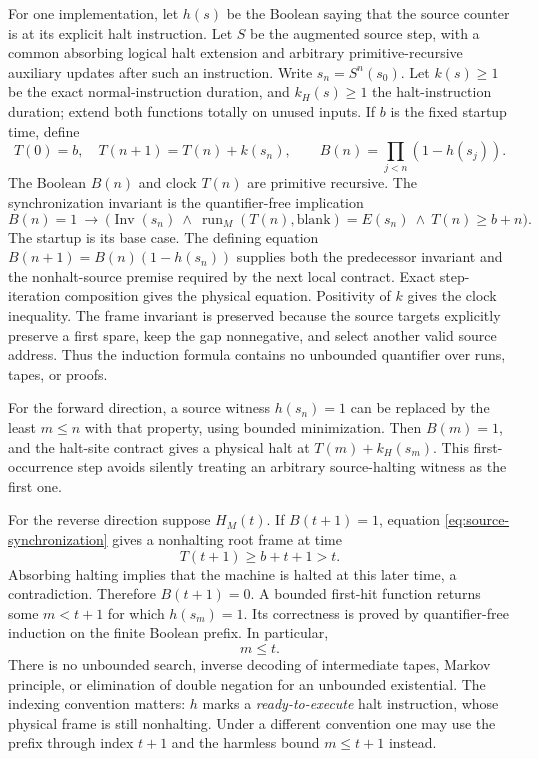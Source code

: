 For one implementation, let $h(s)$ be the Boolean saying that the source
counter is at its explicit halt instruction.  Let $S$ be the augmented
source step, with a common absorbing logical halt extension and arbitrary
primitive-recursive auxiliary updates after such an instruction.  Write $s_n=S^n(s_0)$.  Let $k(s)\ge1$ be the exact
normal-instruction duration, and $k_H(s)\ge1$ the halt-instruction duration;
extend both functions totally on unused inputs.  If $b$ is the fixed
startup time, define
\[
 T(0)=b,\quad T(n+1)=T(n)+k(s_n),\qquad
 B(n)=\prod_{j<n}(1-h(s_j)).
\]
The Boolean $B(n)$ and clock $T(n)$ are primitive recursive.
The synchronization invariant is the quantifier-free implication
\[
 B(n)=1\ \longrightarrow\
 \bigl(\operatorname{Inv}(s_n)\ \wedge\
   \operatorname{run}_M(T(n),\mathrm{blank})=E(s_n)
   \ \wedge\ T(n)\ge b+n\bigr).
 \tag{S}\label{eq:source-synchronization}
\]
The startup is its base case.  The defining equation
$B(n+1)=B(n)(1-h(s_n))$ supplies both the predecessor invariant and the
nonhalt-source premise required by the next local contract.  Exact
step-iteration composition gives the physical equation.  Positivity of
$k$ gives the clock inequality.  The frame invariant is preserved because
the source targets explicitly preserve a first spare, keep the gap
nonnegative, and select another valid source address.  Thus the induction
formula contains no unbounded quantifier over runs, tapes, or proofs.

For the forward direction, a source witness $h(s_n)=1$ can be replaced by
the least $m\le n$ with that property, using bounded minimization.  Then
$B(m)=1$, and the halt-site contract gives a physical halt at
$T(m)+k_H(s_m)$.  This first-occurrence step avoids silently treating an
arbitrary source-halting witness as the first one.

For the reverse direction suppose $H_M(t)$.  If $B(t+1)=1$, equation
\eqref{eq:source-synchronization} gives a nonhalting root frame at time
\[
 T(t+1)\ge b+t+1>t.
\]
Absorbing halting implies that the machine is halted at this later time,
a contradiction.  Therefore $B(t+1)=0$.  A bounded first-hit function
returns some $m<t+1$ for which $h(s_m)=1$.  Its correctness is proved by
quantifier-free induction on the finite Boolean prefix.  In particular,
\[
 m\le t.
\]
There is no unbounded search, inverse decoding of intermediate tapes,
Markov principle, or elimination of double negation for an unbounded
existential.  The indexing convention matters: $h$ marks a
\emph{ready-to-execute} halt instruction, whose physical frame is still
nonhalting.  Under a different convention one may use the prefix through
index $t+1$ and the harmless bound $m\le t+1$ instead.

